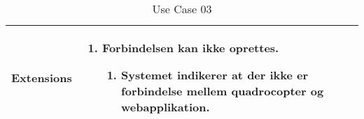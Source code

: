 \begin{table}[H]
\begin{tabular}{|l|p{10cm}|}
Extensions							& 

									\renewcommand{\labelenumi}{\Roman{enumi}:}
									\renewcommand{\labelenumii}{\alph{enumii})}
									\begin{enumerate}[topsep=0.0cm,leftmargin=0.5cm]
										\item Forbindelsen kan ikke oprettes.
											\begin{enumerate}[topsep=0cm, leftmargin=1cm]
												\item Systemet indikerer at der ikke er forbindelse mellem quadrocopter og
webapplikation.
											\end{enumerate}
									\end{enumerate} \\\hline	

\end{tabular}
\caption{Use Case 03}
\label{tab:UC03}
\end{table}